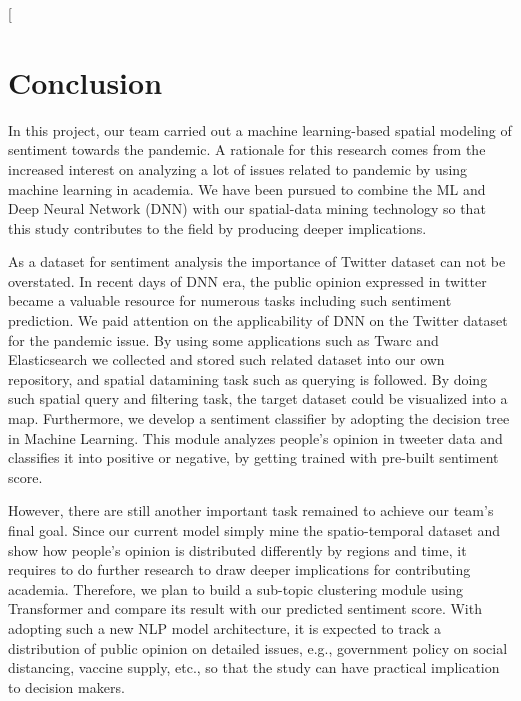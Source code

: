 [\section{Conclusion}
In this project, our team carried out a machine learning-based spatial
modeling of sentiment towards the pandemic. A rationale for this research
comes from the increased interest on analyzing a lot of issues related to
pandemic by using machine learning in academia. We have been pursued to
combine the ML and Deep Neural Network (DNN) with our spatial-data mining
technology so that this study contributes to the field by producing deeper
implications.

As a dataset for sentiment analysis the importance of Twitter dataset can not
be overstated. In recent days of DNN era, the public opinion expressed in
twitter became a valuable resource for numerous tasks including such
sentiment prediction. We paid attention on the applicability of DNN on the
Twitter dataset for the pandemic issue. By using some applications such as
Twarc and Elasticsearch we collected and stored such related dataset into our
own repository, and spatial datamining task such as querying is followed. By
doing such spatial query and filtering task, the target dataset could be
visualized into a map. Furthermore, we develop a sentiment classifier by
adopting the decision tree in Machine Learning. This module analyzes people's
opinion in tweeter data and classifies it into positive or negative, by
getting trained with pre-built sentiment score.

However, there are still another important task remained to achieve our team's
final goal. Since our current model simply mine the spatio-temporal dataset
and show how people's opinion is distributed differently by regions and time,
it requires to do further research to draw deeper implications for
contributing academia. Therefore, we plan to build a sub-topic clustering
module using Transformer and compare its result with our predicted sentiment
score. With adopting such a new NLP model architecture, it is expected to
track a distribution of public opinion on detailed issues, e.g., government
policy on social distancing, vaccine supply, etc., so that the study can have
practical implication to decision makers. 
